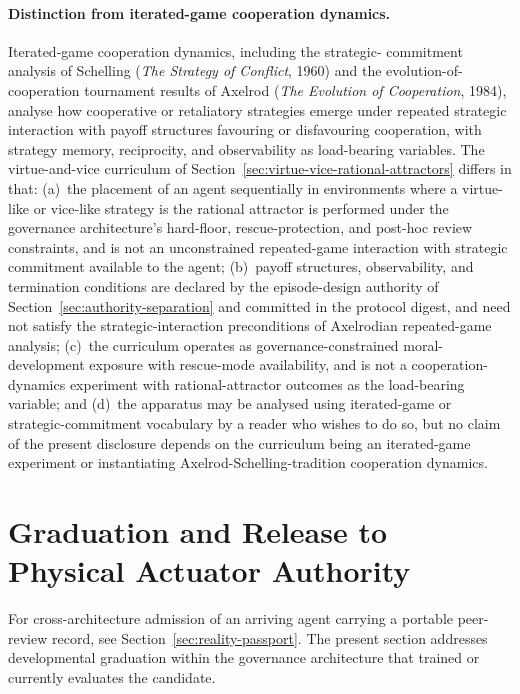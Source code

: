 \documentclass[a4paper,12pt]{article}
\begin{document}
\paragraph{Distinction from iterated-game cooperation dynamics.}
Iterated-game cooperation dynamics, including the strategic-
commitment analysis of Schelling (\emph{The Strategy of
Conflict}, 1960) and the evolution-of-cooperation tournament
results of Axelrod (\emph{The Evolution of Cooperation}, 1984),
analyse how cooperative or retaliatory strategies emerge under
repeated strategic interaction with payoff structures favouring
or disfavouring cooperation, with strategy memory, reciprocity,
and observability as load-bearing variables. The
virtue-and-vice curriculum of
Section~\ref{sec:virtue-vice-rational-attractors} differs in
that: (a)~the placement of an agent sequentially in
environments where a virtue-like or vice-like strategy is the
rational attractor is performed under the governance
architecture's hard-floor, rescue-protection, and post-hoc
review constraints, and is not an unconstrained repeated-game
interaction with strategic commitment available to the agent;
(b)~payoff structures, observability, and termination
conditions are declared by the episode-design authority of
Section~\ref{sec:authority-separation} and committed in the
protocol digest, and need not satisfy the strategic-interaction
preconditions of Axelrodian repeated-game analysis;
(c)~the curriculum operates as governance-constrained
moral-development exposure with rescue-mode availability, and
is not a cooperation-dynamics experiment with rational-attractor
outcomes as the load-bearing variable; and (d)~the apparatus
may be analysed using iterated-game or strategic-commitment
vocabulary by a reader who wishes to do so, but no claim of the
present disclosure depends on the curriculum being an
iterated-game experiment or instantiating
Axelrod-Schelling-tradition cooperation dynamics.

\section{Graduation and Release to Physical Actuator Authority}
\label{sec:graduation}

For cross-architecture admission of an arriving agent carrying a
portable peer-review record, see
Section~\ref{sec:reality-passport}. The present section addresses
developmental graduation within the governance architecture that
trained or currently evaluates the candidate.
\end{document}

